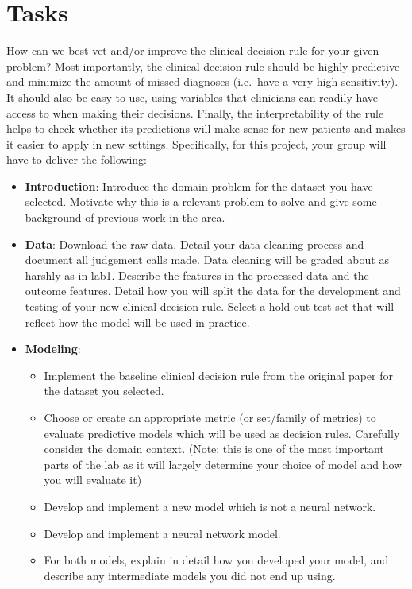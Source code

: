 \documentclass[letterpaper,12pt]{article}
\begin{document}
\section{Tasks}

How can we best vet and/or improve the clinical decision rule for your given problem? Most importantly, the clinical decision rule should be highly predictive and minimize the amount of missed diagnoses (i.e.~have a very high sensitivity). It should also be easy-to-use, using variables that clinicians can readily have access to when making their decisions. Finally, the interpretability of the rule helps to check whether its predictions will make sense for new patients and makes it easier to apply in new settings. Specifically, for this project, your group will have to deliver the following:

\begin{itemize}
    \item \textbf{Introduction}: Introduce the domain problem for the dataset you have selected. Motivate why this is a relevant problem to solve and give some background of previous work in the area.
    \item \textbf{Data}: Download the raw data. Detail your data cleaning process and document all judgement calls made. Data cleaning will be graded about as harshly as in lab1. Describe the features in the processed data and the outcome features. Detail how you will split the data for the development and testing of your new clinical decision rule. Select a hold out test set that will reflect how the model will be used in practice.
    \item \textbf{Modeling}:
        \begin{itemize}
            \item Implement the baseline clinical decision rule from the original paper for the dataset you selected.
            \item Choose or create an appropriate metric (or set/family of metrics) to evaluate predictive models which will be used as decision rules. Carefully consider the domain context. (Note: this is one of the most important parts of the lab as it will largely determine your choice of model and how you will evaluate it)
            \item Develop and implement a new model which is not a neural network.
            \item Develop and implement a neural network model.
            \item For both models, explain in detail how you developed your model, and describe any intermediate models you did not end up using.

\end{itemize}
\end{itemize}
\end{document}
